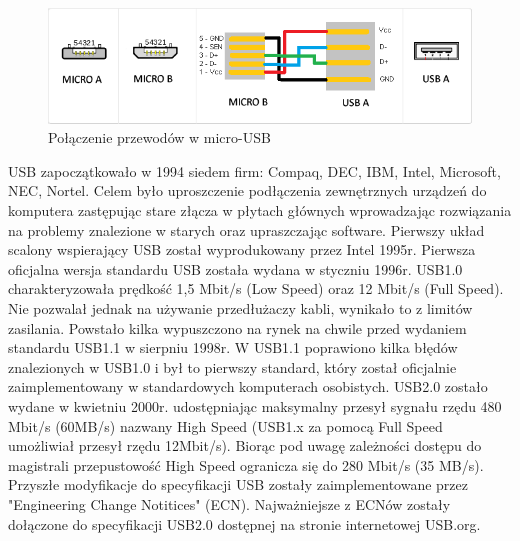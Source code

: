 \documentclass{BscUS}
\begin{document}
\begin{figure}[h]
\centering
\includegraphics[width=15cm]{./img/micro-usb-type}
\caption{Połączenie przewodów w micro-USB}
\end{figure}
%
%
\indent USB zapoczątkowało w 1994 siedem firm: Compaq, DEC, IBM, Intel, Microsoft, NEC, Nortel. Celem było uproszczenie podłączenia zewnętrznych urządzeń do komputera zastępując stare złącza w płytach głównych wprowadzając rozwiązania na problemy znalezione w starych oraz upraszczając software.
Pierwszy układ scalony wspierający USB został wyprodukowany przez Intel 1995r.
\newline
\indent Pierwsza oficjalna wersja standardu USB została wydana w styczniu 1996r. USB1.0 charakteryzowała prędkość 1,5 Mbit/s (Low Speed) oraz 12 Mbit/s (Full Speed). Nie pozwalał jednak na używanie przedłużaczy kabli, wynikało to z limitów zasilania. %
Powstało kilka wypuszczono na rynek na chwile przed wydaniem standardu USB1.1 w sierpniu 1998r. W USB1.1 poprawiono kilka błędów znalezionych w USB1.0 i był to pierwszy standard, który został oficjalnie zaimplementowany w standardowych komputerach osobistych. \cite{USBSystemArch}
\newline
\indent USB2.0 zostało wydane w kwietniu 2000r. udostępniając maksymalny przesył sygnału rzędu 480 Mbit/s (60MB/s) nazwany High Speed (USB1.x za pomocą Full Speed umożliwiał przesył rzędu 12Mbit/s). Biorąc pod uwagę zależności dostępu do magistrali przepustowość High Speed ogranicza się do 280 Mbit/s (35 MB/s).
Przyszłe modyfikacje do specyfikacji USB zostały zaimplementowane przez "Engineering Change Notitices" (ECN). Najważniejsze z ECNów zostały dołączone do specyfikacji USB2.0 dostępnej na stronie internetowej USB.org.
\end{document}
